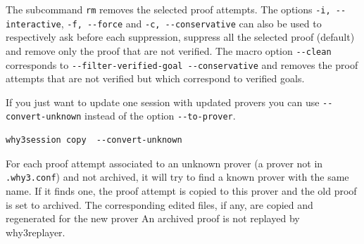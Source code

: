 The subcommand \texttt{rm} removes the selected proof
attempts. The options \verb|-i, --interactive|, \verb|-f, --force| and
\verb|-c, --conservative| can also be used to respectively ask before
each suppression, suppress all the selected proof (default) and remove
only the proof that are not verified. The macro option \verb|--clean|
corresponds to \verb|--filter-verified-goal --conservative| and
removes the proof attempts that are not verified but which correspond
to verified goals.


If you just want to update one session with updated provers you can
use \verb|--convert-unknown| instead of the option \verb|--to-prover|.
\begin{verbatim}
why3session copy  --convert-unknown
\end{verbatim}
For each proof attempt associated to an unknown prover (a prover not in
\verb|.why3.conf|) and not archived, it will try to find a known prover
with the same name. If it finds one, the proof attempt is copied to this
prover and the old proof is set to archived. The corresponding edited
files, if any, are copied and regenerated for the new prover An archived
proof is not replayed by why3replayer.



